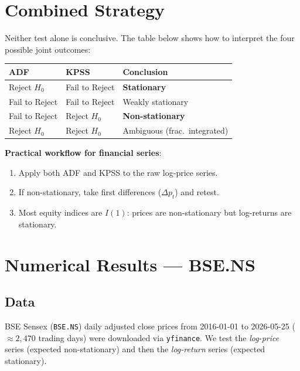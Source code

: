 \documentclass[10pt,a4paper,twocolumn]{article}
\begin{document}
\section{Combined Strategy}

Neither test alone is conclusive.  The table below shows how to
interpret the four possible joint outcomes:

\begin{center}\small
\begin{tabular}{@{}p{2.1cm}p{1.9cm}p{2.2cm}@{}}
\toprule
ADF & KPSS & Conclusion\\\midrule
Reject $H_0$ & Fail to Reject & \textbf{Stationary}\\
Fail to Reject & Fail to Reject & Weakly stationary\\
Fail to Reject & Reject $H_0$ & \textbf{Non-stationary}\\
Reject $H_0$ & Reject $H_0$ & Ambiguous (frac.\ integrated)\\
\bottomrule
\end{tabular}
\end{center}

\noindent\textbf{Practical workflow for financial series}:
\begin{enumerate}\setlength\itemsep{1pt}
  \item Apply both ADF and KPSS to the raw log-price series.
  \item If non-stationary, take first differences ($\Delta p_t$)
        and retest.
  \item Most equity indices are $I(1)$: prices are non-stationary
        but log-returns are stationary.
\end{enumerate}

\section{Numerical Results --- BSE.NS}

\subsection{Data}

BSE Sensex (\texttt{BSE.NS}) daily adjusted close prices from
2016-01-01 to 2026-05-25 (${\approx}2{,}470$ trading days) were
downloaded via \texttt{yfinance}.  We test the \emph{log-price}
series (expected non-stationary) and then the \emph{log-return}
series (expected stationary).
\end{document}
